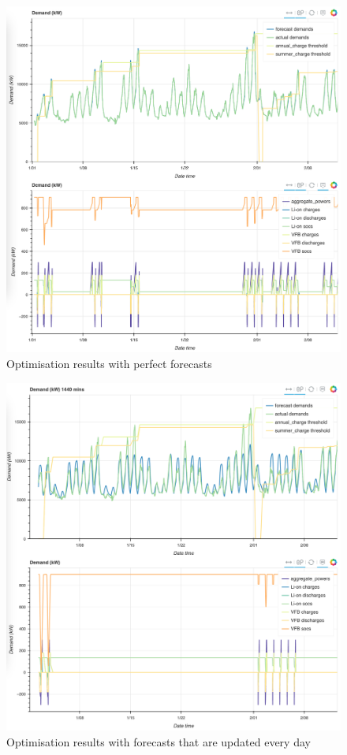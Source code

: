 \begin{landscape}
\end{landscape}

\begin{figure}[p]
	\centering
	\includegraphics[width=1\linewidth]{pics/perfect-forecasts}
	\caption{Optimisation results with perfect forecasts}
	\label{fig:perfect-forecasts}
\end{figure}

\begin{figure}[p]
	\centering
	\includegraphics[width=1\linewidth]{pics/1440min-forecasts}
	\caption{Optimisation results with forecasts that are updated every day}
	\label{fig:1440min-forecasts}
\end{figure}

